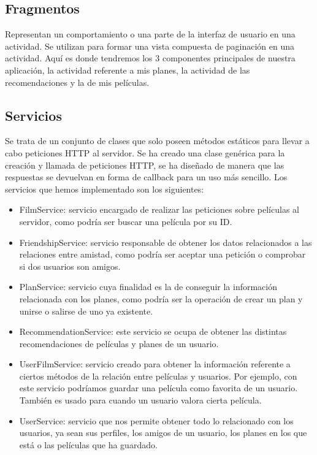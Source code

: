 \subsection{Fragmentos}
\label{makereference4.4.5}
Representan un comportamiento o una parte de la interfaz de usuario en una actividad.
Se utilizan para formar una vista compuesta de paginación en una actividad. 
Aquí es donde tendremos los 3 componentes principales de nuestra aplicación, la actividad referente a mis planes, la actividad de las recomendaciones y la de mis películas.

\subsection{Servicios}
\label{makereference4.4.6}
Se trata de un conjunto de clases que solo poseen métodos estáticos para llevar a cabo peticiones HTTP al servidor. Se ha creado una clase genérica para la creación y llamada de peticiones HTTP, se ha diseñado de manera que las respuestas se devuelvan en forma de callback para un uso más sencillo.
Los servicios que hemos implementado son los siguientes:
\begin{itemize}
    \item FilmService: servicio encargado de realizar las peticiones sobre películas al servidor, como podría ser buscar una película por su ID.
    \item FriendshipService: servicio responsable de obtener los datos relacionados a las relaciones entre amistad, como podría ser aceptar una petición o comprobar si dos usuarios son amigos.
    \item PlanService: servicio cuya finalidad es la de conseguir la información relacionada con los planes, como podría ser la operación de crear un plan y unirse o salirse de uno ya existente.
    \item RecommendationService: este servicio se ocupa de obtener las distintas recomendaciones de películas y planes de un usuario.
    \item UserFilmService: servicio creado para obtener la información referente a ciertos métodos de la relación entre películas y usuarios. Por ejemplo, con este servicio podríamos guardar una película como favorita de un usuario. También es usado para cuando un usuario valora cierta película.
    \item UserService: servicio que nos permite obtener todo lo relacionado con los usuarios, ya sean sus perfiles, los amigos de un usuario, los planes en los que está o las películas que ha guardado.
\end{itemize}

